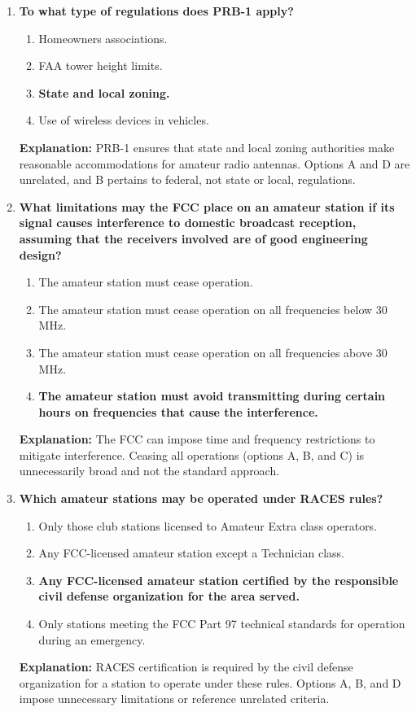 \begin{enumerate}
\item \textbf{To what type of regulations does PRB-1 apply?}
\begin{enumerate}
    \item Homeowners associations.\\
    \item FAA tower height limits.\\
    \item \textbf{State and local zoning.}\\
    \item Use of wireless devices in vehicles.
\end{enumerate}
\textbf{Explanation:} PRB-1 ensures that state and local zoning authorities make reasonable accommodations for amateur radio antennas. Options A and D are unrelated, and B pertains to federal, not state or local, regulations.

\item \textbf{What limitations may the FCC place on an amateur station if its signal causes interference to domestic broadcast reception, assuming that the receivers involved are of good engineering design?}
\begin{enumerate}
    \item The amateur station must cease operation.\\
    \item The amateur station must cease operation on all frequencies below 30 MHz.\\
    \item The amateur station must cease operation on all frequencies above 30 MHz.\\
    \item \textbf{The amateur station must avoid transmitting during certain hours on frequencies that cause the interference.}
\end{enumerate}
\textbf{Explanation:} The FCC can impose time and frequency restrictions to mitigate interference. Ceasing all operations (options A, B, and C) is unnecessarily broad and not the standard approach.

\item \textbf{Which amateur stations may be operated under RACES rules?}
\begin{enumerate}
    \item Only those club stations licensed to Amateur Extra class operators.\\
    \item Any FCC-licensed amateur station except a Technician class.\\
    \item \textbf{Any FCC-licensed amateur station certified by the responsible civil defense organization for the area served.}\\
    \item Only stations meeting the FCC Part 97 technical standards for operation during an emergency.
\end{enumerate}
\textbf{Explanation:} RACES certification is required by the civil defense organization for a station to operate under these rules. Options A, B, and D impose unnecessary limitations or reference unrelated criteria.


\end{enumerate}
